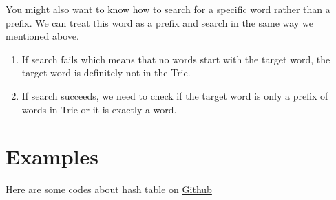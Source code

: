 You might also want to know how to search for a specific word rather than a prefix.
We can treat this word as a prefix and search in the same way we mentioned above.  


\begin{enumerate}
\item If search fails which means that no words start with the target word, the target word is definitely not in the Trie.
\item If search succeeds, we need to check if the target word is only a prefix of words in Trie or it is exactly a word. 
\end{enumerate}


\section{Examples}
\label{sec:examples-3}

Here are some codes about hash table on \href{https://github.com/mingmingli916/algorithms/tree/main/trie}{Github}



